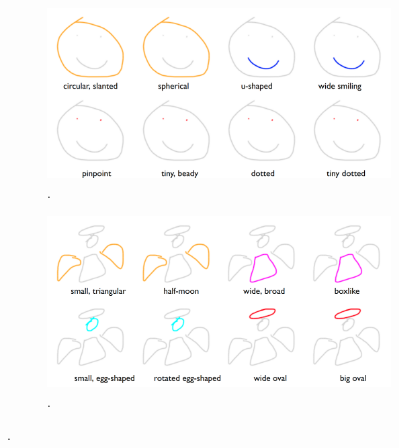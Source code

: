\begin{figure}[!htb]
\begin{subfigure}{\textwidth}
\centering
\includegraphics[width=\linewidth]{data_collection/summary/smileyface_descriptions.png}  
\caption{.}
\label{datasummary.face.varied_language}
\end{subfigure}
\newline
\begin{subfigure}{\textwidth}
\centering
\includegraphics[width=\linewidth]{data_collection/summary/angel_descriptions.png}  
\caption{.}
\label{datasummary.angel.varied_language}
\end{subfigure}
\caption{.}
\label{datasummary.face_angel.varied_language}
\end{figure}



